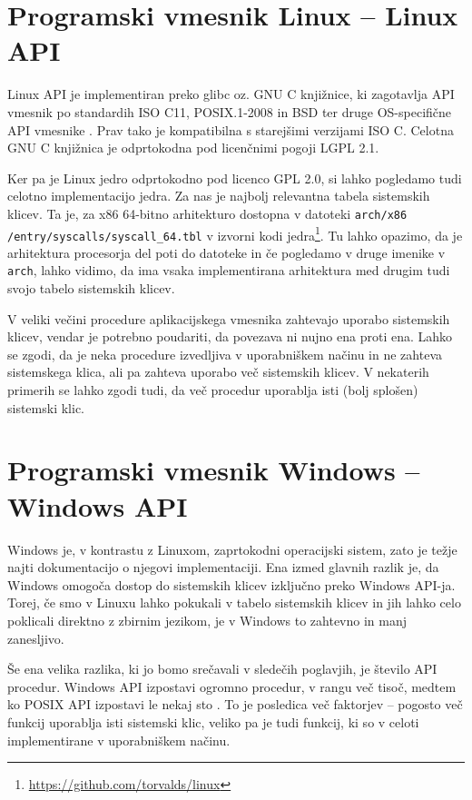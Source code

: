 \documentclass[a4paper,12pt,openright]{book}
\begin{document}
\section{Programski vmesnik Linux -- Linux API}

Linux API je implementiran preko glibc oz. GNU C knjižnice, ki zagotavlja API vmesnik po standardih ISO C11, POSIX.1-2008 in BSD ter druge OS-specifične API vmesnike \cite{GNU_Manual}.
Prav tako je kompatibilna s starejšimi verzijami ISO C.
Celotna GNU C knjižnica je odprtokodna pod licenčnimi pogoji LGPL 2.1.

Ker pa je Linux jedro odprtokodno pod licenco GPL 2.0, si lahko pogledamo tudi celotno implementacijo jedra.
Za nas je najbolj relevantna tabela sistemskih klicev.
Ta je, za x86 64-bitno arhitekturo dostopna v datoteki \texttt{arch/x86} \texttt{/entry/syscalls/syscall\_64.tbl} v izvorni kodi jedra\footnote{\url{https://github.com/torvalds/linux}}.
Tu lahko opazimo, da je arhitektura procesorja del poti do datoteke in če pogledamo v druge imenike v \texttt{arch}, lahko vidimo, da ima vsaka implementirana arhitektura med drugim tudi svojo tabelo sistemskih klicev.

V veliki večini procedure aplikacijskega vmesnika zahtevajo uporabo sistemskih klicev, vendar je potrebno poudariti, da povezava ni nujno ena proti ena.
Lahko se zgodi, da je neka procedure izvedljiva v uporabniškem načinu in ne zahteva sistemskega klica, ali pa zahteva uporabo več sistemskih klicev.
V nekaterih primerih se lahko zgodi tudi, da več procedur uporablja isti (bolj splošen) sistemski klic.

\section{Programski vmesnik Windows -- Windows API} \label{sec:windows_api}

Windows je, v kontrastu z Linuxom, zaprtokodni operacijski sistem, zato je težje najti dokumentacijo o njegovi implementaciji.
Ena izmed glavnih razlik je, da Windows omogoča dostop do sistemskih klicev izključno preko Windows API-ja.
Torej, če smo v Linuxu lahko pokukali v tabelo sistemskih klicev in jih lahko celo poklicali direktno z zbirnim jezikom, je v Windows to zahtevno in manj zanesljivo.

Še ena velika razlika, ki jo bomo srečavali v sledečih poglavjih, je število API procedur.
Windows API izpostavi ogromno procedur, v rangu več tisoč, medtem ko POSIX API izpostavi le nekaj sto \cite{Tanenbaum_Bos_2023}.
To je posledica več faktorjev -- pogosto več funkcij uporablja isti sistemski klic, veliko pa je tudi funkcij, ki so v celoti implementirane v uporabniškem načinu.
\end{document}
